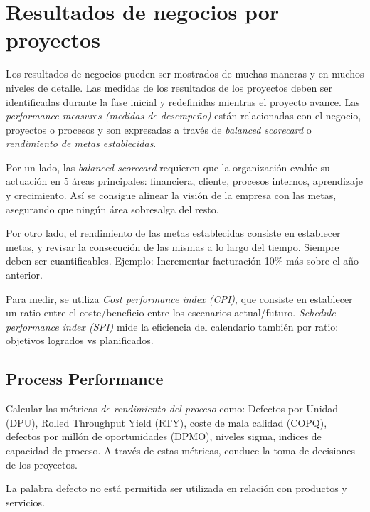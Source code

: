 \documentclass[]{article}
\begin{document}
\section{Resultados de negocios por proyectos}

Los resultados de negocios pueden ser mostrados de muchas maneras y en muchos niveles de detalle. Las medidas de los resultados de los proyectos deben ser identificadas durante la fase inicial y redefinidas mientras el proyecto avance. Las \textit{performance measures (medidas de desempeño)} están relacionadas con el negocio, proyectos o procesos y son expresadas a través de \textit{balanced scorecard} o \textit{rendimiento de metas establecidas}.

Por un lado, las \textit{balanced scorecard} requieren que la organización evalúe su actuación en 5 áreas principales: financiera, cliente, procesos internos, aprendizaje y crecimiento. Así se consigue alinear la visión de la empresa con las metas, asegurando que ningún área sobresalga del resto.

Por otro lado, el rendimiento de las metas establecidas consiste en establecer metas, y revisar la consecución de las mismas a lo largo del tiempo. Siempre deben ser cuantificables. Ejemplo: Incrementar facturación 10\% más sobre el año anterior.

Para medir, se utiliza \textit{Cost performance index (CPI)}, que consiste en establecer un ratio entre el coste/beneficio entre los escenarios actual/futuro. \textit{Schedule performance index (SPI)} mide la eficiencia del calendario también por ratio: objetivos logrados vs planificados.
	
\subsection{Process Performance}

Calcular las métricas \textit{de rendimiento del proceso} como: Defectos por Unidad (DPU), Rolled Throughput Yield (RTY), coste de mala calidad (COPQ), defectos por millón de oportunidades (DPMO), niveles sigma, indices de capacidad de proceso. A través de estas métricas, conduce la toma de decisiones de los proyectos.

La palabra defecto no está permitida ser utilizada en relación con productos y servicios.
\end{document}

